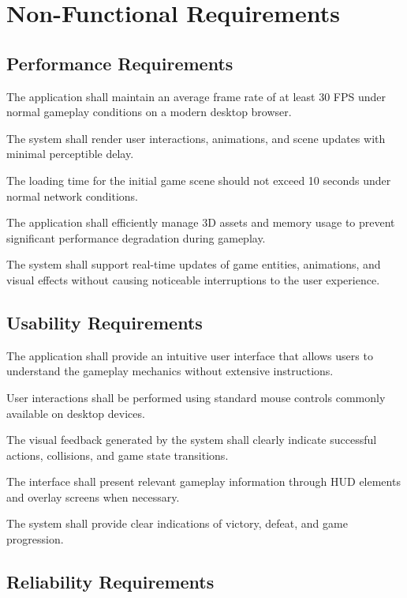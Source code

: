 \documentclass[11pt,a4paper]{article}
\begin{document}
\section{Non-Functional Requirements}

\subsection{Performance Requirements}

The application shall maintain an average frame rate of at least 30 FPS under
normal gameplay conditions on a modern desktop browser.

The system shall render user interactions, animations, and scene updates with
minimal perceptible delay.

The loading time for the initial game scene should not exceed 10 seconds under
normal network conditions.

The application shall efficiently manage 3D assets and memory usage to prevent
significant performance degradation during gameplay.

The system shall support real-time updates of game entities, animations, and
visual effects without causing noticeable interruptions to the user experience.

\subsection{Usability Requirements}

The application shall provide an intuitive user interface that allows users to
understand the gameplay mechanics without extensive instructions.

User interactions shall be performed using standard mouse controls commonly
available on desktop devices.

The visual feedback generated by the system shall clearly indicate successful
actions, collisions, and game state transitions.

The interface shall present relevant gameplay information through HUD elements and
overlay screens when necessary.

The system shall provide clear indications of victory, defeat, and game
progression.

\subsection{Reliability Requirements}
\end{document}
